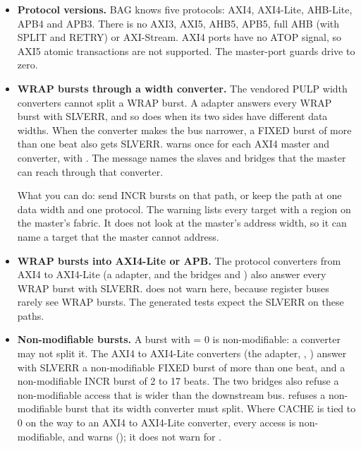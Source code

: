 \begin{itemize}
\item \textbf{Protocol versions.} BAG knows five protocols: AXI4, AXI4-Lite, AHB-Lite,
  APB4 and APB3. There is no AXI3, AXI5, AHB5, APB5, full AHB (with SPLIT and RETRY) or
  AXI-Stream. AXI4 ports have no ATOP signal, so AXI5 atomic transactions are not
  supported. The master-port guards drive  to zero.
\item \textbf{WRAP bursts through a width converter.} The vendored PULP width converters
  cannot split a WRAP burst. A  adapter answers every WRAP burst with SLVERR, and
  so does  when its two sides have different data widths. When the
  converter makes the bus narrower, a FIXED burst of more than one beat also gets
  SLVERR.  warns once for each AXI4 master and converter, with
  . The message names the slaves and bridges that the master can
  reach through that converter.

  What you can do: send INCR bursts on that path, or keep the path at one data width and
  one protocol. The warning lists every target with a region on the master's fabric. It
  does not look at the master's address width, so it can name a target that the master
  cannot address.
\item \textbf{WRAP bursts into AXI4-Lite or APB.} The protocol converters from AXI4 to
  AXI4-Lite (a  adapter, and the bridges  and
  ) also answer every WRAP burst with SLVERR.  does not
  warn here, because register buses rarely see WRAP bursts. The generated tests expect the
  SLVERR on these paths.
\item \textbf{Non-modifiable bursts.} A burst with  = 0 is
  non-modifiable: a converter may not split it. The AXI4 to AXI4-Lite converters (the
   adapter, , ) answer with SLVERR a
  non-modifiable FIXED burst of more than one beat, and a non-modifiable INCR burst of 2 to
  17 beats. The two bridges also refuse a non-modifiable access that is wider than the
  downstream bus.  refuses a non-modifiable burst that its width
  converter must split. Where CACHE is tied to 0 on the way to an AXI4 to AXI4-Lite
  converter, every access is non-modifiable, and  warns
  (); it does not warn for .


\end{itemize}
